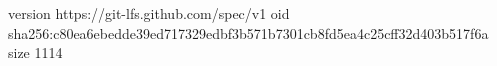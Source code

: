 version https://git-lfs.github.com/spec/v1
oid sha256:c80ea6ebedde39ed717329edbf3b571b7301cb8fd5ea4c25cff32d403b517f6a
size 1114
